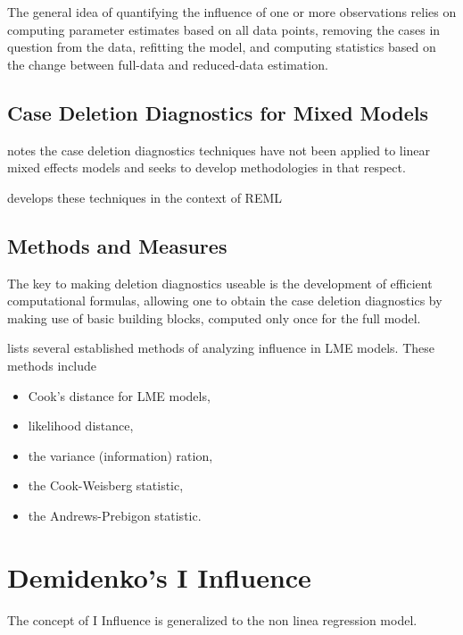 \documentclass[12pt, a4paper]{article}
\begin{document}
The general idea of quantifying the influence of one or more observations relies on computing parameter estimates based on all data points, removing the cases in question from the data, refitting the model, and computing statistics based on the change between full-data and reduced-data estimation. 




\subsection{Case Deletion Diagnostics for Mixed Models}

\citet{Christiansen} notes the case deletion diagnostics techniques have not been applied to linear mixed effects models and seeks to develop methodologies in that respect.

\citet{Christiansen} develops these techniques in the context of REML

\subsection{Methods and Measures}
The key to making deletion diagnostics useable is the development of efficient computational formulas, allowing one to obtain the  case deletion diagnostics by making use of basic building blocks, computed only once for the full model.

\citet{Zewotir} lists several established methods of analyzing influence in LME models. These methods include \begin{itemize}
	\item Cook's distance for LME models,
	\item {} likelihood distance,
	\item the variance (information) ration,
	\item the  Cook-Weisberg statistic,
	\item the  Andrews-Prebigon statistic.
\end{itemize}



\section{Demidenko's I Influence} %
The concept of I Influence is generalized  to the non linea regression model.
\end{document}
